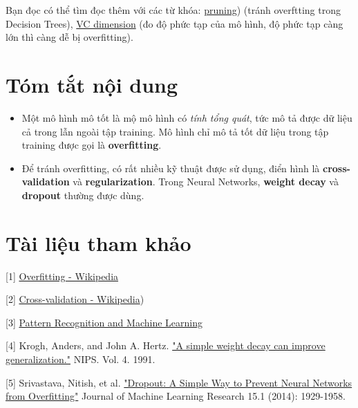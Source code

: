 Bạn đọc có thể tìm đọc thêm với các từ khóa: \href{https://en.wikipedia.org/wiki/Pruning_(decision_trees}{pruning}) (tránh overftting trong Decision Trees), \href{https://en.wikipedia.org/wiki/VC_dimension}{VC dimension} (đo độ phức tạp của mô hình, độ phức tạp càng lớn thì càng dễ bị overfitting). 
 
 
\section{Tóm tắt nội dung}

\begin{itemize}
    \item Một mô hình mô tốt là mộ mô hình có \textit{tính tổng quát}, tức mô tả được dữ liệu cả trong lẫn ngoài tập training. Mô hình chỉ mô tả tốt dữ liệu trong tập training được gọi là \textbf{overfitting}. 
     
    \item Để tránh overfitting, có rất nhiều kỹ thuật được sử dụng, điển hình là \textbf{cross-validation} và \textbf{regularization}. Trong Neural Networks, \textbf{weight decay} và \textbf{dropout} thường được dùng. 
\end{itemize}
 
 
\section{Tài liệu tham khảo}
 
[1] \href{https://en.wikipedia.org/wiki/Overfitting}{Overfitting - Wikipedia} 
 
[2] \href{https://en.wikipedia.org/wiki/Cross-validation_(statistics}{Cross-validation - Wikipedia}) 
 
[3] \href{http://machinelearningcoban.comusers.isr.ist.utl.pt/~wurmd/Livros/school/Bishop - Pattern Recognition And Machine Learning - Springer  2006.pdf}{Pattern Recognition and Machine Learning} 
 
[4] Krogh, Anders, and John A. Hertz. \href{https://papers.nips.cc/paper/563-a-simple-weight-decay-can-improve-generalization.pdf}{"A simple weight decay can improve generalization."} NIPS. Vol. 4. 1991. 
 
[5] Srivastava, Nitish, et al. \href{http://jmlr.org/papers/volume15/srivastava14a/srivastava14a.pdf}{"Dropout: A Simple Way to Prevent Neural Networks from  Overfitting"} Journal of Machine Learning Research 15.1 (2014): 1929-1958. 
 
